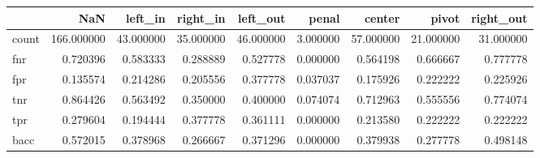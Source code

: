 \begin{tabular}{lrrrrrrrr}
\toprule
{} &         NaN &    left\_in &   right\_in &   left\_out &     penal &     center &      pivot &  right\_out \\
\midrule
count &  166.000000 &  43.000000 &  35.000000 &  46.000000 &  3.000000 &  57.000000 &  21.000000 &  31.000000 \\
fnr   &    0.720396 &   0.583333 &   0.288889 &   0.527778 &  0.000000 &   0.564198 &   0.666667 &   0.777778 \\
fpr   &    0.135574 &   0.214286 &   0.205556 &   0.377778 &  0.037037 &   0.175926 &   0.222222 &   0.225926 \\
tnr   &    0.864426 &   0.563492 &   0.350000 &   0.400000 &  0.074074 &   0.712963 &   0.555556 &   0.774074 \\
tpr   &    0.279604 &   0.194444 &   0.377778 &   0.361111 &  0.000000 &   0.213580 &   0.222222 &   0.222222 \\
bacc  &    0.572015 &   0.378968 &   0.266667 &   0.371296 &  0.000000 &   0.379938 &   0.277778 &   0.498148 \\
\bottomrule
\end{tabular}
